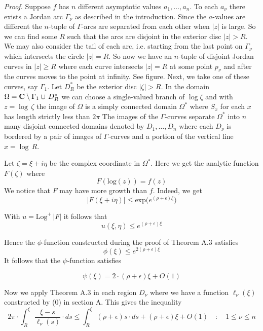 \noindent
\emph{Proof.}
Suppose $f$ has $n$ different asymptotic values
$a_1,\ldots,a_n$.
To each  $a_\nu$ there exists a Jordan arc $\Gamma_\nu$ as described in the introduction.
Since the $a$-values are different the $n$-tuple of
$\Gamma$-arcs are separated from each other when
$|z|$ is large.
So we can find some $R$ such that
the arcs are disjoint in the exterior disc
$|z|>R$. We may also consider the tail of each arc, i.e. starting from
the last point on $\Gamma_\nu$ which intersects the circle
$|z|=R$. So now we have an $n$-tuple of disjoint Jordan
curves in $|z|\geq R$ where each curve intersects $|z|=R$ at some point $p_\nu$ and after the curves moves to the point at infinity. See figure.
Next, we take one of these curves, say $\Gamma_1$. Let
$D_R^*$ be the exterior disc $|\zeta |>R$.
In the domain
$\Omega={\bf{C}}\setminus \Gamma_1\cup\,D_R^*$ we can choose a single-valued
branch of $\log \zeta$ and with $z=\log\,\zeta $
the image of $\Omega$ is a simply connected domain 
$\Omega^*$
where
$S_x$ for each $x$ has length strictly less than
$2\pi$
The images of the $\Gamma$-curves
separate $\Omega^*$
into $n$ many disjoint connected
domains
denoted by $D_1,\ldots,D_n$ where
each $D_\nu$ is bordered by a pair of images of $\Gamma$-curves
and a portion of the vertical line $x=\log \,R$.

\medskip

\noindent
Let $\zeta=\xi+i\eta$ be the complex coordinate
in $\Omega^*$.
Here we get the analytic function
$F(\zeta)$ where
\[ F(\text{log}(z))= f(z)
\]
We notice that $F$ may have more growth than $f$. Indeed, we get
\[
|F(\xi+i\eta)|\leq \text{exp}\bigl(e^{(\rho+\epsilon)\xi}\bigr)\tag{1}
\]

\medskip

\noindent
With $u=\text{Log}^+\,|F|$ it follows that
\[ 
u(\xi,\eta)\leq e^{(\rho+\epsilon)\xi}\tag{2}
\]


\noindent
Hence the $\phi$-function constructed
during the proof of Theorem A.3  satisfies
\[
\phi(\xi)\leq e^{2(\rho+\epsilon)\xi}
\]
It follows that the $\psi$-function satisfies


\[ 
\psi(\xi)=2\cdot (\rho+\epsilon)\xi+O(1)\tag{3}
\]


\noindent Now we  apply Theorem A.3  in each region $D_\nu$
where we have a function
$\ell_\nu(\xi)$ constructed by (0) in section A. 
This gives the inequality
\[
2\pi\cdot \int_R^\xi\, \frac{\xi-s}{\ell_\nu(s)}\cdot ds\leq
\int_R^\xi\, (\rho+\epsilon)s\cdot ds+(\rho+\epsilon)\xi+O(1)\quad\colon\quad
1\leq \nu\leq n\tag{4}
\]
\medskip


